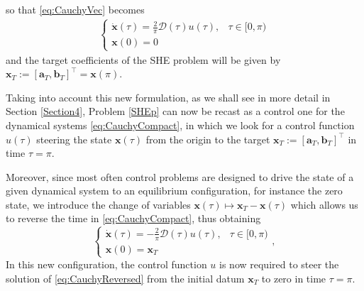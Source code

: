 so that \eqref{eq:CauchyVec} becomes
\begin{align}\label{eq:CauchyCompact}
	\begin{cases}
		\displaystyle\dot{\bm{x}}(\tau) = \frac 2\pi\bm{\mathcal{D}}(\tau) u(\tau),  & \tau \in [0,\pi)
		\\[6pt]
		\bm{x}(0) = {0}
	\end{cases}
\end{align}
and the target coefficients of the SHE problem will be given by $\bm{x}_T:=[\bm{a}_T,\bm{b}_T]^\top=\bm{x}(\pi)$.

Taking into account this new formulation, as we shall see in more detail in Section \ref{Section4}, Problem \ref{SHEp} can now be recast as a control one for the dynamical systems \eqref{eq:CauchyCompact}, in which we look for a control function $u(\tau)$ steering the state $\bm{x}(\tau)$ from the origin to the target $\bm{x}_T:=[\bm{a}_T,\bm{b}_T]^\top$ in time $\tau = \pi$.

Moreover, since most often control problems are designed to drive the state of a given dynamical system to an equilibrium configuration, for instance the zero state, we introduce the change of variables $\bm{x}(\tau)\mapsto \bm{x}_T - \bm{x}(\tau)$ which allows us to reverse the time in \eqref{eq:CauchyCompact}, thus obtaining 
\begin{equation}\label{eq:CauchyReversed}
    \begin{cases}
        \displaystyle\dot{\bm{x}}(\tau) = -\frac 2\pi\bm{\mathcal{D}}(\tau)u(\tau),  & \tau \in [0,\pi)
        \\[6pt]
        \bm{x}(0) = \bm{x}_T
    \end{cases},
\end{equation}
In this new configuration, the control function $u$ is now required to steer the solution of \eqref{eq:CauchyReversed} from the initial datum $\bm{x}_T$ to zero in time $\tau=\pi$. 

